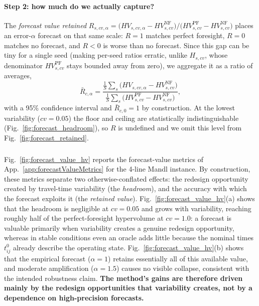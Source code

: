 \documentclass[a4paper,fleqn]{cas-sc}
\begin{document}
\paragraph{Step 2: how much do we actually capture?} The \emph{forecast value retained} $R_{s,\textit{cv},\alpha}=\bigl(HV_{s,\textit{cv},\alpha}-HV^{\mathrm{NF}}_{s,\textit{cv}}\bigr)/\bigl(HV^{\mathrm{PF}}_{s,\textit{cv}}-HV^{\mathrm{NF}}_{s,\textit{cv}}\bigr)$ places an error-$\alpha$ forecast on that same scale: $R=1$ matches perfect foresight, $R=0$ matches no forecast, and $R<0$ is worse than no forecast. Since this gap can be tiny for a single seed (making per-seed ratios erratic, unlike $H_{s,\textit{cv}}$, whose denominator $HV^{\mathrm{PF}}_{s,\textit{cv}}$ stays bounded away from zero), we aggregate it as a ratio of averages,
\begin{equation}
\bar R_{c,\alpha}=\frac{\tfrac1S\sum_s\big(HV_{s,\textit{cv},\alpha}-HV^{\mathrm{NF}}_{s,\textit{cv}}\big)}{\tfrac1S\sum_s\big(HV^{\mathrm{PF}}_{s,\textit{cv}}-HV^{\mathrm{NF}}_{s,\textit{cv}}\big)},
\end{equation}
with a 95\% confidence interval and $\bar R_{c,0}=1$ by construction. At the lowest variability ($cv=0.05$) the floor and ceiling are statistically indistinguishable (Fig.~\ref{fig:forecast_headroom}), so $R$ is undefined and we omit this level from Fig.~\ref{fig:forecast_retained}.

\subsubsection{}\label{app:forecast_sensitivity}

Fig.~\ref{fig:forecast_value_hv} reports the forecast-value metrics of App.~\ref{app:forecastValueMetrics} for the 4-line Mandl instance. By construction, these metrics separate two otherwise-conflated effects: the redesign opportunity created by travel-time variability (the \emph{headroom}), and the accuracy with which the forecast exploits it (the \emph{retained value}). Fig.~\ref{fig:forecast_value_hv}(a) shows that the headroom is negligible at $cv=0.05$ and grows with variability, reaching roughly half of the perfect-foresight hypervolume at $cv=1.0$: a forecast is valuable primarily when variability creates a genuine redesign opportunity, whereas in stable conditions even an oracle adds little because the nominal times $t_{ij}^{0}$ already describe the operating state. Fig.~\ref{fig:forecast_value_hv}(b) shows that the empirical forecast ($\alpha=1$) retains essentially all of this available value, and moderate amplification ($\alpha=1.5$) causes no visible collapse, consistent with the intended robustness claim. \textbf{The method's gains are therefore driven mainly by the redesign opportunities that variability creates, not by a dependence on high-precision forecasts.}
\end{document}
